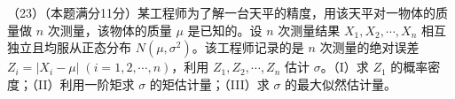 \documentclass[UTF8,12pt]{ctexart}
\begin{document}
（23）（本题满分11分）某工程师为了解一台天平的精度，用该天平对一物体的质量做 \(\displaystyle n\) 次测量，该物体的质量 \(\displaystyle \mu\) 是已知的。设 \(\displaystyle n\) 次测量结果 \(\displaystyle X_1,\allowbreak X_2,\allowbreak \cdots,\allowbreak X_n\) 相互独立且均服从正态分布 \(\displaystyle N(\mu,\allowbreak \sigma^2)\)。该工程师记录的是 \(\displaystyle n\) 次测量的绝对误差 \(\displaystyle Z_i=|X_i-\mu|\;(i=1,\allowbreak 2,\allowbreak \cdots,\allowbreak n)\)，利用 \(\displaystyle Z_1,\allowbreak Z_2,\allowbreak \cdots,\allowbreak Z_n\) 估计 \(\displaystyle \sigma\)。（I）求 \(\displaystyle Z_1\) 的概率密度；（II）利用一阶矩求 \(\displaystyle \sigma\) 的矩估计量；（III）求 \(\displaystyle \sigma\) 的最大似然估计量。


\clearpage
\end{document}
